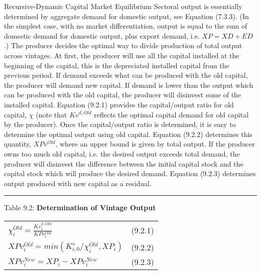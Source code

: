 \documentclass{article}
\begin{document}
Recursive-Dynamic Capital Market Equilibrium
Sectoral output is essentially determined by aggregate demand for domestic output, see Equation (7.3.3). (In the simplest case, with no market differentiation, output is equal to the sum of domestic demand for domestic output, plus export demand, i.e. $XP = XD+ED$.) The producer decides the optimal way to divide production of total output across vintages. At first, the producer will use all the capital installed at the beginning of the capital, this is the depreciated installed capital from the previous period. If demand exceeds what can be produced with the old capital, the producer will demand new capital. If demand is lower than the output which can be produced with the old capital, the producer will disinvest some of the installed capital.
Equation (9.2.1) provides the capital/output ratio for old capital, $\chi$ (note that $Kv^{d,Old}$ reflects the optimal capital demand for old capital by the producer). Once the capital/output ratio is determined, it is easy to determine the optimal output using old capital. Equation (9.2.2) determines this quantity, $XPv^{Old}$, where an upper bound is given by total output. If the producer owns too much old capital, i.e. the desired output exceeds total demand, the producer will disinvest the difference between the initial capital stock and the capital stock which will produce the desired demand. Equation (9.2.3) determines output produced with new capital as a residual.


\noindent\rule{\linewidth}{0.4pt}

\begin{center}
\begin{large}


{\centering Table 9.2: \textbf{Determination of Vintage Output} \par}

\begin{tabular}{>{\raggedright}p{} l}

$\chi^{Old}_i = \frac{Kv^{d,Old}_i}{KPv^{Old}_i}$ & (9.2.1) \\[20pt]

$XPv^{Old}_i = min\left(K^s_{i,0} / \chi^{Old}_i, XP_i \right)$ & (9.2.2) \\[15pt]

$XPv^{New}_i = XP_i - XPv^{New}_i$ & (9.2.3) \\[20pt]

\hline
\end{tabular}
\end{large}
\end{center}
\end{document}
